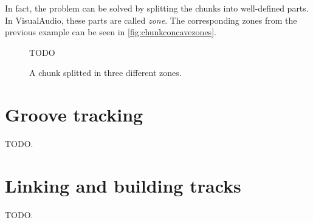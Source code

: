 In fact, the problem can be solved by splitting the chunks into well-defined parts. In VisualAudio, these parts are called \emph{zone}. The corresponding zones from the previous example can be seen in \autoref{fig:chunkconcavezones}.

\begin{figure}[!ht]
\centering
TODO
\caption%
{A chunk splitted in three different zones.}
\label{fig:chunkconcavezones}
\end{figure}

\chapter{Groove tracking}

TODO.

\chapter{Linking and building tracks}

TODO.

%
%
%

%

%

%



